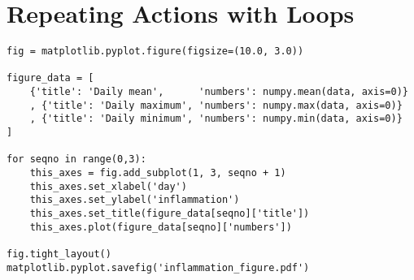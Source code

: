 \section{Repeating Actions with Loops}
\begin{multicols*}{2}

\vspace{-4mm}
\begin{verbatim}
fig = matplotlib.pyplot.figure(figsize=(10.0, 3.0))

figure_data = [
    {'title': 'Daily mean',      'numbers': numpy.mean(data, axis=0)}
    , {'title': 'Daily maximum', 'numbers': numpy.max(data, axis=0)}
    , {'title': 'Daily minimum', 'numbers': numpy.min(data, axis=0)}
]

for seqno in range(0,3):
    this_axes = fig.add_subplot(1, 3, seqno + 1)
    this_axes.set_xlabel('day')
    this_axes.set_ylabel('inflammation')
    this_axes.set_title(figure_data[seqno]['title'])
    this_axes.plot(figure_data[seqno]['numbers'])

fig.tight_layout()
matplotlib.pyplot.savefig('inflammation_figure.pdf')
\end{verbatim}

\end{multicols*}